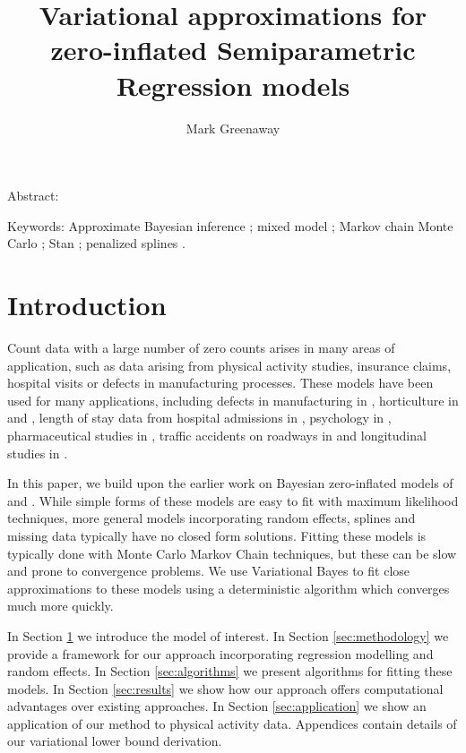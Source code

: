 \documentclass{article}[12pt]
\title{Variational approximations for zero-inflated Semiparametric Regression
			 models}
\author{Mark Greenaway}
\begin{document}
\maketitle

Abstract:

Keywords: Approximate Bayesian inference ; mixed model ; Markov chain Monte Carlo ; Stan ; 
					penalized splines .

\section{Introduction}
\label{sec:introduction}

Count data with a large number of zero counts arises in many areas of application, such as data arising from
physical activity studies, insurance claims, hospital visits or defects in manufacturing processes. These
models have been used for many applications, including defects in manufacturing in \cite{lambert1992},
horticulture in \cite{BIOM:BIOM1030} and \cite{Hall2000}, length of stay data from hospital admissions in
\cite{BIMJ:BIMJ200390024}, psychology in \cite{JOFP:rethink}, pharmaceutical studies in \cite{Min01042005},
traffic accidents on roadways in \cite{Shankar1997829} and longitudinal studies in
\cite{LeeWangScottYauMcLachlan2006}.

In this paper, we build upon the earlier work on Bayesian zero-inflated models of \cite{Ghosh20061360} and
\cite{VatsaWilson2014}. While simple forms of these models are easy to fit with maximum likelihood techniques,
more general models incorporating random effects, splines and missing data typically have no closed form
solutions. Fitting these models is typically done with Monte Carlo Markov Chain techniques, but these can be
slow and prone to convergence problems. We use Variational Bayes to fit close approximations to these models
using a deterministic algorithm which converges much more quickly.

In Section \ref{sec:introduction} we introduce the model of interest. In Section \ref{sec:methodology} we
provide a framework for our approach incorporating regression modelling and random effects. In Section
\ref{sec:algorithms} we present algorithms for fitting these models. In Section \ref{sec:results} we show how
our approach offers computational advantages over existing approaches. In Section \ref{sec:application} we
show an application of our method to physical activity data. Appendices contain details of our variational
lower bound derivation.
\end{document}
